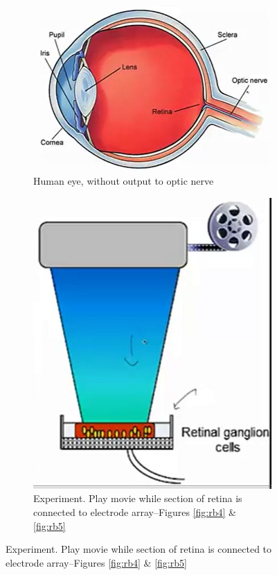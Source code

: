 \documentclass[]{article}
\begin{document}
\begin{figure}[H]
	\begin{center}
		\caption{What is the neural code?}
		\begin{subfigure}[t]{0.45\textwidth}
			\caption{Human eye, without output to optic nerve}
			\includegraphics[width=\textwidth]{human-eye}
		\end{subfigure}
		\begin{subfigure}[to]{0.45\textwidth}
			\caption{Experiment. Play movie while section of retina is connected to electrode array--Figures \ref{fig:rb4} \& \ref{fig:rb5}}
			\includegraphics[width=\textwidth]{human-eye-experiment}

\end{subfigure}
\end{center}
\end{figure}
\end{document}
